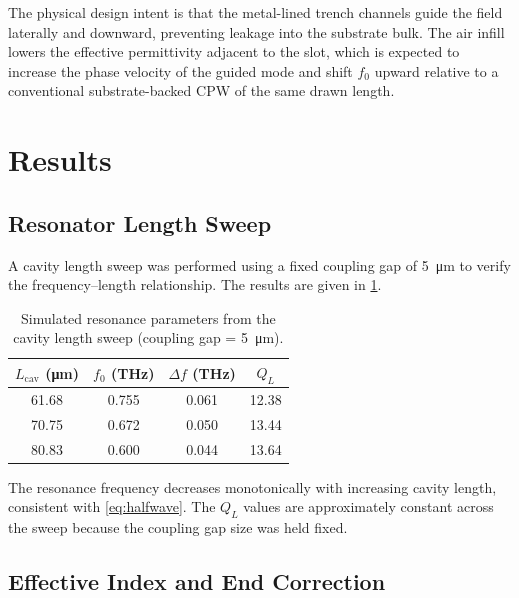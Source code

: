 \documentclass[12pt,a4paper]{article}
\begin{document}
The physical design intent is that the metal-lined trench channels guide
the field laterally and downward, preventing leakage into the substrate
bulk. The air infill lowers the effective permittivity adjacent to the
slot, which is expected to increase the phase velocity of the guided
mode and shift $f_0$ upward relative to a conventional substrate-backed
CPW of the same drawn length.

\newpage
\section{Results}
\label{sec:results}

\subsection{Resonator Length Sweep}

A cavity length sweep was performed using a fixed coupling gap of
\SI{5}{\micro\metre} to verify the frequency--length relationship.
The results are given in \cref{tab:length_sweep}.

\begin{table}[htbp]
    \centering
    \caption{Simulated resonance parameters from the cavity length sweep
    (coupling gap = \SI{5}{\micro\metre}).}
    \label{tab:length_sweep}
    \begin{tabular}{cccc}
        \toprule
        $L_{\mathrm{cav}}$ (\si{\micro\metre}) &
        $f_0$ (\si{\tera\hertz}) &
        $\Delta f$ (\si{\tera\hertz}) &
        $Q_L$ \\
        \midrule
        61.68 & 0.755 & 0.061 & 12.38 \\
        70.75 & 0.672 & 0.050 & 13.44 \\
        80.83 & 0.600 & 0.044 & 13.64 \\
        \bottomrule
    \end{tabular}
\end{table}

The resonance frequency decreases monotonically with increasing cavity
length, consistent with \cref{eq:halfwave}. The $Q_L$ values are
approximately constant across the sweep because the coupling gap size
was held fixed.

\subsection{Effective Index and End Correction}
\end{document}
